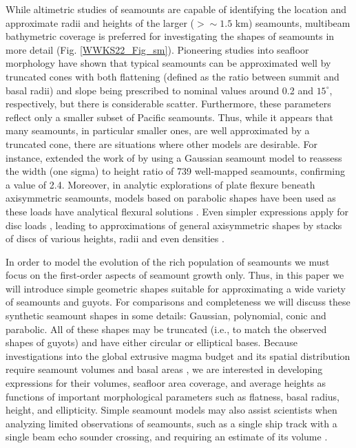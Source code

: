 While altimetric studies of seamounts are capable of identifying the location and approximate radii
and heights of the larger ($> \sim 1.5$ km) seamounts, multibeam bathymetric coverage is preferred for investigating
the shapes of seamounts in more detail (Fig. \ref{WWKS22_Fig_sm}).  Pioneering studies into seafloor morphology
\citep{JMS1983,SJ1988,S1988} have shown that typical seamounts can be approximated well by truncated cones
with both flattening (defined as the ratio between summit and basal radii) and slope being prescribed
to nominal values around 0.2 and $15^\circ$, respectively, but there is considerable scatter. Furthermore,
these parameters reflect only a smaller subset of Pacific seamounts.
Thus, while it appears that many seamounts, in particular smaller ones, are well approximated by a truncated cone,
there are situations where other models are desirable.  For instance, \citet{G2022} extended the work of
\citet{S1988} by using a Gaussian seamount model to reassess the width (one sigma) to height ratio of 739
well-mapped seamounts, confirming a value of 2.4.  Moreover, in analytic explorations of plate flexure
beneath axisymmetric seamounts, models based on parabolic shapes have been used as these loads have analytical
flexural solutions \citep[e.g.,~][]{LN1980,W2001,KW2010}.  Even simpler expressions apply for disc loads
\citep{BS1969}, leading to approximations of general axisymmetric shapes by stacks of discs of various heights,
radii and even densities \citep[e.g.,~][]{HC1994}.

In order to model the evolution of the rich population of seamounts we must focus on the first-order
aspects of seamount growth only.  Thus, in this paper we will introduce simple geometric shapes suitable
for approximating a wide variety of seamounts and guyots.
For comparisons and completeness we will discuss these synthetic
seamount shapes in some details: Gaussian, polynomial, conic and parabolic.  All of these shapes may be truncated
(i.e., to match the observed shapes of guyots) and have either circular or elliptical bases.  Because investigations
into the global extrusive magma budget and its spatial distribution require seamount volumes and basal areas \citep[e.g.,~][]{B1982},
we are interested in developing expressions for their volumes, seafloor area coverage, and average heights
as functions of important morphological parameters such as flatness, basal radius, height, and ellipticity.
Simple seamount models may also assist scientists when analyzing limited observations of seamounts, such as a single
ship track with a single beam echo sounder crossing, and requiring an estimate of its volume \citep[e.g.,~][]{HW2007}. 


